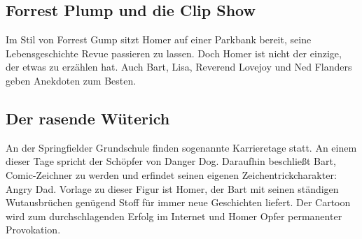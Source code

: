 \subsection{Forrest Plump und die Clip Show}
Im Stil von Forrest Gump sitzt Homer auf einer Parkbank bereit, seine Lebensgeschichte Revue passieren zu lassen. Doch Homer ist nicht der einzige, der etwas zu erzählen hat. Auch Bart, Lisa, Reverend Lovejoy und Ned Flanders geben Anekdoten zum Besten.


\subsection{Der rasende Wüterich}\label{DABF13}
An der Springfielder Grundschule finden sogenannte Karrieretage statt. An einem dieser Tage spricht der Schöpfer von \glqq Danger Dog\grqq . Daraufhin beschließt Bart, Comic-Zeichner zu werden und erfindet seinen eigenen Zeichentrickcharakter: \glqq Angry Dad\grqq . Vorlage zu dieser Figur ist Homer, der Bart mit seinen ständigen Wutausbrüchen genügend Stoff für immer neue Geschichten liefert. Der Cartoon wird zum durchschlagenden Erfolg im Internet und Homer Opfer permanenter Provokation.

